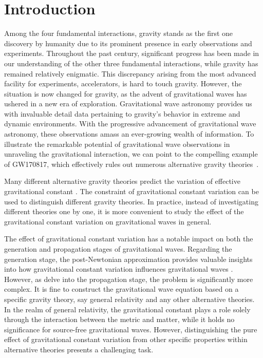 \documentclass[prd,aps,a4paper,superscriptaddress,onecolumn,nofootinbib]{revtex4}
\begin{document}
\maketitle

\tableofcontents

\section{Introduction}
\label{sec:intro}
Among the four fundamental interactions, gravity stands as the first one discovery by humanity due to its prominent presence in early observations and experiments.
Throughout the past century, significant progress has been made in our understanding of the other three fundamental interactions, while gravity has remained relatively enigmatic.
This discrepancy arising from the most advanced facility for experiments, accelerators, is hard to touch gravity.
However, the situation is now changed for gravity, as the advent of gravitational waves has ushered in a new era of exploration.
Gravitational wave astronomy provides us with invaluable detail data pertaining to gravity's behavior in extreme and dynamic environments.
With the progressive advancement of gravitational wave astronomy, these observations amass an ever-growing wealth of information.
To illustrate the remarkable potential of gravitational wave observations in unraveling the gravitational interaction, we can point to the compelling example of GW170817, which effectively rules out numerous alternative gravity theories~\cite{PhysRevLett.119.251301,PhysRevLett.119.251302,PhysRevLett.119.251303,PhysRevLett.119.251304}.

Many different alternative gravity theories predict the variation of effective gravitational constant \cite{2002ApJ...570..463L,PhysRevD.97.104068,2003sttg.book.....F}.
The constraint of gravitational constant variation can be used to distinguish different gravity theories.
In practice, instead of investigating different theories one by one, it is more convenient to study the effect of the gravitational constant variation on gravitational waves in general.


The effect of gravitational constant variation has a notable impact on both the generation and propagation stages of gravitational waves.
Regarding the generation stage, the post-Newtonian approximation provides valuable insights into how gravitational constant variation influences gravitational waves \cite{WANG2022137416,PhysRevD.107.064073}. However, as delve into the propagation stage, the problem is significantly more complex. It is fine to construct the gravitational wave equation based on a specific gravity theory, say general relativity and any other alternative theories.
In the realm of general relativity, the gravitational constant plays a role solely through the interaction between the metric and matter, while it holds no significance for source-free gravitational waves.
However, distinguishing the pure effect of gravitational constant variation from other specific properties within alternative theories presents a challenging task.
\end{document}
